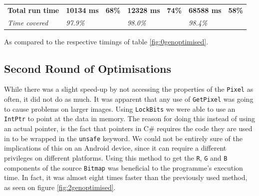 \begin{table}[H]
\begin{tabular}{@{}lllllll@{}}
		\textbf{Total run time} & \textbf{10134 ms}                                                                         & \textbf{68\%}                                                                  & \textbf{12328 ms}                                                                          & \textbf{74\%}                                                                 & \textbf{68588 ms}                                                                       & \textbf{58\%}                                                                 \\
		\textit{Time covered}   & \textit{97.9\%}                                                                           & \textit{}                                                                      & \textit{98.0\%}                                                                            &                                                                               & \textit{98.4\%}                                                                         & \textit{}                                                                     \\ \bottomrule
	\end{tabular}
	\begin{tablenotes}
		\footnotesize{\item \textdagger As compared to the respective timings of table \ref{fig:0genoptimised}.}
	\end{tablenotes}
\end{table}

\subsection{Second Round of Optimisations}
While there was a slight speed-up by not accessing the properties of the \lstinline|Pixel| as often, it did not do as much.
It was apparent that any use of \lstinline|GetPixel| was going to cause problems on larger images.
Using \lstinline|LockBits| we were able to use an \lstinline|IntPtr| to point at the data in memory. \citep{MSDNIntPtr}
The reason for doing this instead of using an actual pointer, is the fact that pointers in C\# requires the code they are used in to be wrapped in the \lstinline|unsafe| keyword. 
We could not be entirely sure of the implications of this on an Android device, since it can require a different privileges on different platforms.
Using this method to get the \lstinline|R|, \lstinline|G| and \lstinline|B| components of the source \lstinline|Bitmap| was beneficial to the programme's execution time.
In fact, it was almost eight times faster than the previously used method, as seen on figure \ref{fig:2genoptimised}.


